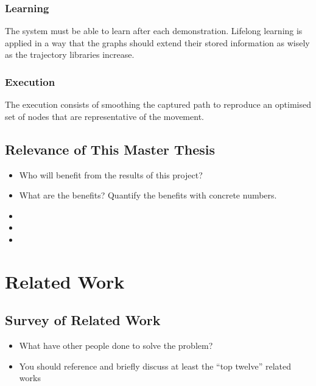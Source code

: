 \documentclass[thesis]{mas_proposal}
\begin{document}
	\subsubsection{Learning}
		The system must be able to learn after each demonstration. Lifelong learning is applied in a way that the graphs should extend their stored information as wisely as the trajectory libraries increase.
	\subsubsection{Execution}
		The execution consists of smoothing the captured path to reproduce an optimised set of nodes that are representative of the movement. 
\subsection{Relevance of This Master Thesis}
\begin{itemize}
    \item Who will benefit from the results of this project?
    \item What are the benefits? Quantify the benefits with concrete numbers.
    \item 
    \item 
    \item 
 \end{itemize}

\section{Related Work}

	\subsection{Survey of Related Work}
	\begin{itemize}
		\item What have other people done to solve the problem?
		\item You should reference and briefly discuss at least the ``top twelve'' related works
	\end{itemize}
	
\end{document}
